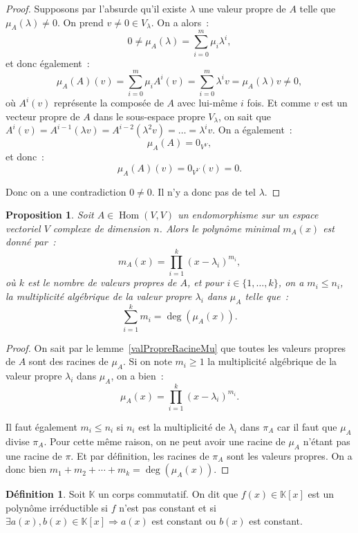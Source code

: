 \documentclass{article}
\DeclareMathOperator{\Hom}{Hom}
\newcommand{\K}{\mathbb K}
\newtheorem{prp}[thm]{Proposition}
\theoremstyle{definition}
\newtheorem{déf}[thm]{Définition}
\theoremstyle{remark}
\begin{document}
		\begin{proof} Supposons par l'absurde qu'il existe $\lambda$ une valeur propre de $A$ telle que $\mu_A(\lambda) \neq 0$. On prend $v \neq 0 \in V_\lambda$.
		On a alors~:
		\[0 \neq \mu_A(\lambda) = \sum_{i=0}^m\mu_i\lambda^i,\]
		et donc également~:
		\[\mu_A(A)(v) = \sum_{i=0}^m\mu_iA^i(v) = \sum_{i=0}^m\lambda^iv = \mu_A(\lambda)v \neq 0,\]
		où $A^i(v)$ représente la composée de $A$ avec lui-même $i$ fois. Et comme $v$ est un vecteur propre de $A$ dans le sous-espace propre $V_\lambda$, on
		sait que $A^i(v) = A^{i-1}(\lambda v) = A^{i-2}(\lambda^2v) = \ldots = \lambda^iv$. On a également~:
		\[\mu_A(A) = 0_{V^V},\]
		et donc~:
		\[\mu_A(A)(v) = 0_{V^V}(v) = 0.\]

		Donc on a une contradiction $0 \neq 0$. Il n'y a donc pas de tel $\lambda$. \end{proof}

		\begin{prp} Soit $A \in \Hom(V, V)$ un endomorphisme sur un espace vectoriel $V$ complexe de dimension $n$. Alors le polynôme minimal $m_A(x)$ est donné par~:
		\[m_A(x) = \prod_{i=1}^k(x-\lambda_i)^{m_i},\]
		où $k$ est le nombre de valeurs propres de $A$, et pour $i \in \{1, \dotsc, k\}$, on a $m_i \leq n_i$, la multiplicité algébrique de la valeur propre
		$\lambda_i$ dans $\mu_A$ telle que~: \[\sum_{i=1}^km_i = \deg(\mu_A(x)).\] \end{prp}

		\begin{proof} On sait par le lemme~\ref{valPropreRacineMu} que toutes les valeurs propres de $A$ sont des racines de $\mu_A$. Si on note $m_i \geq 1$ la
		multiplicité algébrique de la valeur propre $\lambda_i$ dans $\mu_A$, on a bien~:
		\[\mu_A(x) = \prod_{i=1}^k(x-\lambda_i)^{m_i}.\]

		Il faut également $m_i \leq n_i$ si $n_i$ est la multiplicité de $\lambda_i$ dans $\pi_A$ car il faut que $\mu_A$ divise $\pi_A$. Pour cette même raison, on
		ne peut avoir une racine de $\mu_A$ n'étant pas une racine de $\pi$. Et par définition, les racines de $\pi_A$ sont les valeurs propres.
		On a donc bien $m_1 + m_2 + \dotsb + m_k = \deg(\mu_A(x))$. \end{proof}

		\begin{déf} Soit $\K$ un corps commutatif. On dit que $f(x) \in \K[x]$ est un polynôme irréductible si $f$ n'est pas constant et si
		$\exists a(x), b(x) \in \K[x] \Rightarrow a(x)$ est constant ou $b(x)$ est constant. \end{déf}
\end{document}
